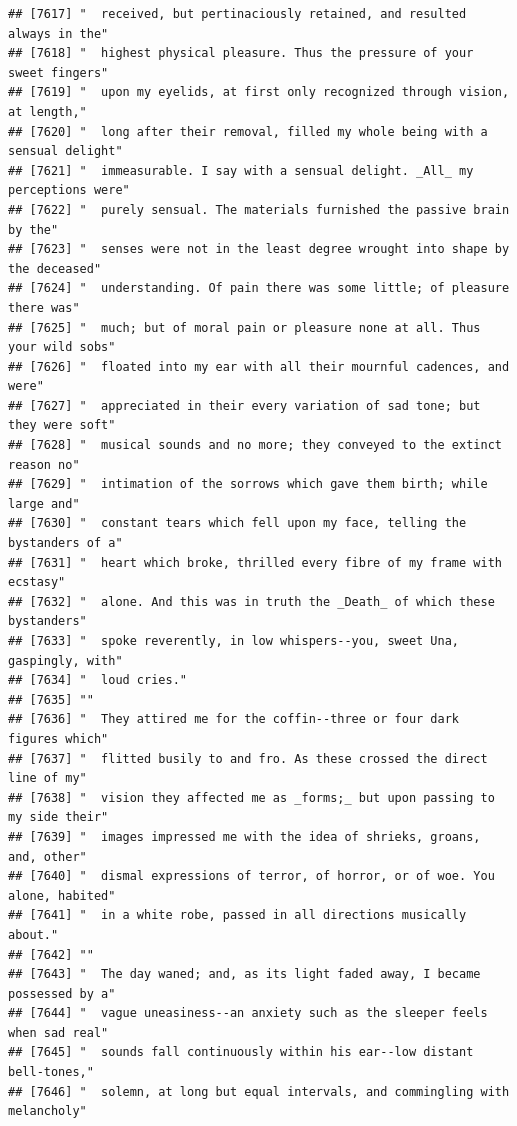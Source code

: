 \documentclass{article}\usepackage[]{graphicx}\usepackage[]{color}
\makeatletter
\newenvironment{kframe}{%
 \def\at@end@of@kframe{}%
 \ifinner\ifhmode%
  \def\at@end@of@kframe{\end{minipage}}%
  \begin{minipage}{\columnwidth}%
 \fi\fi%
 \def\FrameCommand##1{\hskip\@totalleftmargin \hskip-\fboxsep
 \colorbox{shadecolor}{##1}\hskip-\fboxsep
     \hskip-\linewidth \hskip-\@totalleftmargin \hskip\columnwidth}%
 \MakeFramed {\advance\hsize-\width
   \@totalleftmargin\z@ \linewidth\hsize
   \@setminipage}}%
 {\par\unskip\endMakeFramed%
 \at@end@of@kframe}
\newenvironment{knitrout}{}{} %
\makeatother
\begin{document}
\begin{knitrout}
\begin{kframe}
\begin{verbatim}
## [7617] "  received, but pertinaciously retained, and resulted always in the"         
## [7618] "  highest physical pleasure. Thus the pressure of your sweet fingers"        
## [7619] "  upon my eyelids, at first only recognized through vision, at length,"      
## [7620] "  long after their removal, filled my whole being with a sensual delight"    
## [7621] "  immeasurable. I say with a sensual delight. _All_ my perceptions were"     
## [7622] "  purely sensual. The materials furnished the passive brain by the"          
## [7623] "  senses were not in the least degree wrought into shape by the deceased"    
## [7624] "  understanding. Of pain there was some little; of pleasure there was"       
## [7625] "  much; but of moral pain or pleasure none at all. Thus your wild sobs"      
## [7626] "  floated into my ear with all their mournful cadences, and were"            
## [7627] "  appreciated in their every variation of sad tone; but they were soft"      
## [7628] "  musical sounds and no more; they conveyed to the extinct reason no"        
## [7629] "  intimation of the sorrows which gave them birth; while large and"          
## [7630] "  constant tears which fell upon my face, telling the bystanders of a"       
## [7631] "  heart which broke, thrilled every fibre of my frame with ecstasy"          
## [7632] "  alone. And this was in truth the _Death_ of which these bystanders"        
## [7633] "  spoke reverently, in low whispers--you, sweet Una, gaspingly, with"        
## [7634] "  loud cries."                                                               
## [7635] ""                                                                            
## [7636] "  They attired me for the coffin--three or four dark figures which"          
## [7637] "  flitted busily to and fro. As these crossed the direct line of my"         
## [7638] "  vision they affected me as _forms;_ but upon passing to my side their"     
## [7639] "  images impressed me with the idea of shrieks, groans, and, other"          
## [7640] "  dismal expressions of terror, of horror, or of woe. You alone, habited"    
## [7641] "  in a white robe, passed in all directions musically about."                
## [7642] ""                                                                            
## [7643] "  The day waned; and, as its light faded away, I became possessed by a"      
## [7644] "  vague uneasiness--an anxiety such as the sleeper feels when sad real"      
## [7645] "  sounds fall continuously within his ear--low distant bell-tones,"          
## [7646] "  solemn, at long but equal intervals, and commingling with melancholy"      

\end{verbatim}
\end{kframe}
\end{knitrout}
\end{document}
